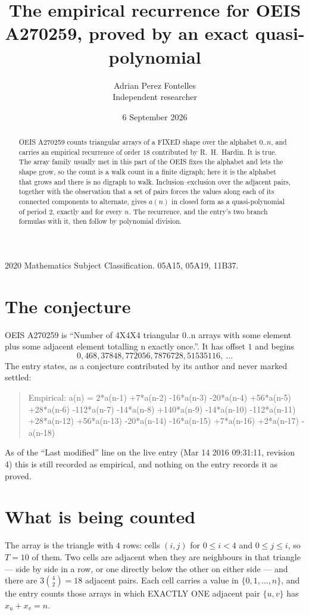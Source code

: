 \documentclass[11pt,a4paper]{article}
\title{The empirical recurrence for OEIS A270259, proved by an exact quasi-polynomial}
\author{Adrian Perez Fontelles\\ \small Independent researcher}
\date{6 September 2026}
\theoremstyle{plain}
\theoremstyle{definition}
\begin{document}
\maketitle

\begin{abstract}
OEIS A270259 counts triangular arrays of a FIXED shape over the alphabet $0..n$, and carries an
empirical recurrence of order $18$ contributed by R.~H.~Hardin. It is true. The array
family usually met in this part of the OEIS fixes the alphabet and lets the shape grow, so the
count is a walk count in a finite digraph; here it is the alphabet that grows and there is no
digraph to walk. Inclusion--exclusion over the adjacent pairs, together with the observation
that a set of pairs forces the values along each of its connected components to alternate,
gives $a(n)$ in closed form as a quasi-polynomial of period $2$, exactly and for every $n$.
The recurrence, and the entry's two branch formulas with it, then follow by polynomial
division.
\end{abstract}

\noindent\small 2020 Mathematics Subject Classification. 05A15, 05A19, 11B37.\normalsize

\section{The conjecture}

OEIS A270259 is ``Number of 4X4X4 triangular 0..n arrays with some element plus some adjacent element totalling n exactly once.''. It has offset $1$ and begins
\[
0, 468, 37848, 772056, 7876728, 51535116,\ \dots
\]
The entry states, as a conjecture contributed by its author and never marked settled:
\begin{quote}
Empirical: a(n) = 2*a(n-1) +7*a(n-2) -16*a(n-3) -20*a(n-4) +56*a(n-5) +28*a(n-6) -112*a(n-7) -14*a(n-8) +140*a(n-9) -14*a(n-10) -112*a(n-11) +28*a(n-12) +56*a(n-13) -20*a(n-14) -16*a(n-15) +7*a(n-16) +2*a(n-17) -a(n-18)
\end{quote}
As of the ``Last modified'' line on the live entry (Mar 14 2016 09:31:11, revision 4) this is still
recorded as empirical, and nothing on the entry records it as proved.

\section{What is being counted}

The array is the triangle with $4$ rows: cells $(i,j)$ for $0\le i<4$ and $0\le j\le i$,
so $T=10$ of them. Two cells are adjacent when they are neighbours in that triangle --- side
by side in a row, or one directly below the other on either side --- and there are
$3\binom{4}{2}=18$ adjacent pairs. Each cell carries a value in
$\{0,1,\dots,n\}$, and the entry counts those arrays in which EXACTLY ONE adjacent pair
$\{u,v\}$ has $x_u+x_v=n$.
\end{document}
